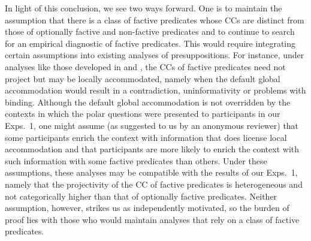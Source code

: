 \documentclass[11pt,fleqn]{article}
\newcommand{\6}{\mbox{$[\hspace*{-.6mm}[$}}
\newcommand{\9}{\mbox{$]\hspace*{-.6mm}]$}}
\begin{document}
In light of this conclusion, we see two ways forward. One is to maintain the assumption that there is a class of factive predicates whose CCs are distinct from those of optionally factive and non-factive predicates and to continue to search for an empirical diagnostic of factive predicates. This would require integrating certain assumptions into existing analyses of presuppositions. For instance, under analyses like those developed in \citealt{heim83} and \citealt{vds92}, the CCs of factive predicates need not project but may be locally accommodated, namely when the default global accommodation would result in a contradiction, uninformativity or problems with binding. Although the default global accommodation is not overridden by the contexts in which the polar questions were presented to participants in our Exps.~1, one might assume  (as suggested to us by an anonymous reviewer) that some participants enrich the context with information that does license local accommodation and that participants are more likely to enrich the context with such information with some factive predicates than others. Under these assumptions, these analyses may be compatible with the results of our Exps.~1, namely that the projectivity of the CC of factive predicates is heterogeneous and not categorically higher than that of optionally factive predicates. Neither assumption, however, strikes us as independently motivated, so the burden of proof lies with those who would maintain analyses that rely on a class of factive predicates. 
\end{document}
